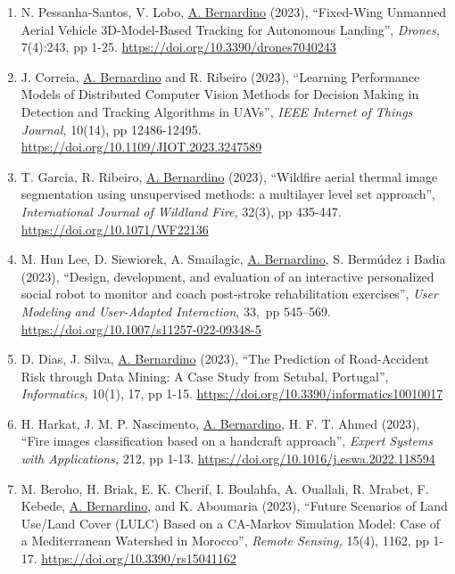 \begin{enumerate}
  R. P. de Figueiredo, \ul{A. Bernardino} (2023), ``An overview of
  space-variant and active vision mechanisms for resource-constrained
  human inspired robotic vision'', \emph{Autonomous Robots,} pp 1-17.
  \url{https://doi.org/10.1007/s10514-023-10107-7}~
\item
  N. Pessanha-Santos, V. Lobo, \ul{A. Bernardino} (2023), ``Fixed-Wing
  Unmanned Aerial Vehicle 3D-Model-Based Tracking for Autonomous
  Landing'', \emph{Drones,} 7(4):243, pp 1-25.
  \url{https://doi.org/10.3390/drones7040243}~
\item
  J. Correia, \ul{A. Bernardino} and R. Ribeiro (2023), ``Learning
  Performance Models of Distributed Computer Vision Methods for Decision
  Making in Detection and Tracking Algorithms in UAVs'', \emph{IEEE
  Internet of Things Journal,} 10(14), pp 12486-12495.
  \url{https://doi.org/10.1109/JIOT.2023.3247589}~
\item
  T. Garcia, R. Ribeiro, \ul{A. Bernardino} (2023), ``Wildfire aerial
  thermal image segmentation using unsupervised methods: a multilayer
  level set approach'', \emph{International Journal of Wildland Fire,}
  32(3), pp 435-447. \url{https://doi.org/10.1071/WF22136}~
\item
  M. Hun Lee, D. Siewiorek, A. Smailagic, \ul{A. Bernardino}, S.
  Bermúdez i Badia (2023), ``Design, development, and evaluation of an
  interactive personalized social robot to monitor and coach post-stroke
  rehabilitation exercises'', \emph{User Modeling and User-Adapted
  Interaction}, 33,~pp 545--569.
  \url{https://doi.org/10.1007/s11257-022-09348-5}~
\item
  D. Dias, J. Silva, \ul{A. Bernardino} (2023), ``The Prediction of
  Road-Accident Risk through Data Mining: A Case Study from Setubal,
  Portugal'', \emph{Informatics,} 10(1), 17, pp 1-15.
  \url{https://doi.org/10.3390/informatics10010017}
\item
  H. Harkat, J. M. P. Nascimento, \ul{A. Bernardino}, H. F. T. Ahmed
  (2023), ``Fire images classification based on a handcraft approach'',
  \emph{Expert Systems with Applications,} 212, pp 1-13.
  \url{https://doi.org/10.1016/j.eswa.2022.118594}~
\item
  M. Beroho, H. Briak, E. K. Cherif, I. Boulahfa, A. Ouallali, R.
  Mrabet, F. Kebede, \ul{A. Bernardino}, and K. Aboumaria (2023),
  ``Future Scenarios of Land Use/Land Cover (LULC) Based on a CA-Markov
  Simulation Model: Case of a Mediterranean Watershed in Morocco'',
  \emph{Remote Sensing,} 15(4), 1162, pp 1-17.
  \url{https://doi.org/10.3390/rs15041162}~

\end{enumerate}
